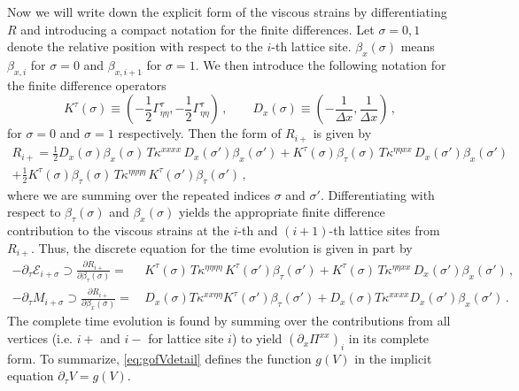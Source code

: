 \documentclass[12pt,aps,preprint,nofootinbib,noshowkeys,noshowpacs,longbibliography,superscriptaddress,tightenlines]{revtex4-2}
\def\edense{{\mathcal{E}}}
\def\pdense{M}
\def\Kd{{K^\tau}}
\begin{document}
Now we will write down the explicit form of the viscous strains by differentiating $R$ and introducing a compact notation for the finite differences.
Let $\sigma=0,1$ denote the relative position with respect to the $i$-th lattice site. $\beta_x(\sigma)$  means $\beta_{x, i}$ for $\sigma = 0$ and $\beta_{x, i+1}$ for $\sigma = 1$.  We then introduce the following notation for the finite difference operators
\begin{equation}
  \Kd(\sigma) \equiv   \left(-\frac{1}{2} \Gamma^{\tau}_{\eta\eta}, -\frac{1}{2} \Gamma^{\tau}_{\eta\eta} \right) \, , 
   \qquad D_x(\sigma) \equiv  \left(-\frac{1}{\Delta x}, \frac{1}{\Delta x} \right)  \, , 
\end{equation}
for $\sigma = 0$ and $\sigma = 1$ respectively.
Then the form of $R_{i+}$ is given by 
  \begin{multline}
  R_{i+} = \frac{1}{2}  D_x(\sigma) \beta_x(\sigma) \, T\kappa^{xxxx} \, D_x(\sigma') \beta_x(\sigma') 
   +   \Kd(\sigma) \beta_\tau(\sigma) \, T\kappa^{\eta\eta xx} \, D_x(\sigma') \beta_x(\sigma')   \\
    + \frac{1}{2}  \Kd(\sigma) \beta_\tau(\sigma) \, T\kappa^{\eta\eta\eta\eta} \, \Kd(\sigma') \beta_\tau(\sigma') \, , 
  \end{multline}
where we are summing over the repeated indices $\sigma$ and $\sigma'$. Differentiating with respect to $\beta_{\tau}(\sigma)$ and $\beta_{x}(\sigma)$ yields the appropriate finite difference contribution to the viscous strains at the $i$-th and $(i+1)$-th lattice sites from $R_{i+}$. Thus, the discrete equation 
for the time evolution is  given in part by
\begin{subequations}
  \label{eq:gofVdetail}
\begin{align}
    -\partial_\tau \edense_{i+\sigma}  \supset \frac{\partial R_{i+}}{\partial \beta_\tau(\sigma)} =&  \,   
    \Kd(\sigma) \, T\kappa^{\eta\eta\eta\eta} \, \Kd(\sigma')\beta_\tau(\sigma') 
     + \Kd(\sigma) \, T\kappa^{\eta\eta xx} \, D_x(\sigma')\beta_x(\sigma')  \, , \\
   -\partial_\tau \pdense_{i+\sigma} \supset \frac{\partial R_{i+}}{\partial \beta_x(\sigma)} =& \,   
     D_x(\sigma) T\kappa^{xx \eta\eta} \Kd(\sigma')\beta_\tau(\sigma') + D_x(\sigma) T\kappa^{xxxx} D_{x} (\sigma') \beta_x(\sigma') \, .
\end{align}
\end{subequations}
The complete time evolution is found by summing over the contributions from all  vertices
(i.e. $i+$ and $i-$ for lattice site $i$) to yield 
$(\partial_x \Pi^{xx})_i$ in its complete form. To summarize,
\cref{eq:gofVdetail} defines the function $g(V)$ in the implicit equation
$\partial_\tau V = g(V)$.
\end{document}
